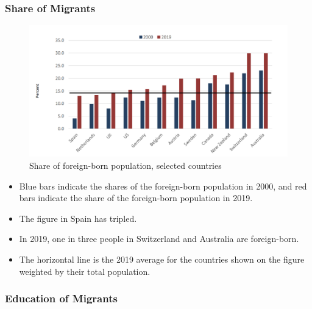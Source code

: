         \subsubsection{Share of Migrants}

            \begin{figure}[H]
                \centering
                \includegraphics[width=4.5in]{images/ch11/2.png}
                \caption{Share of foreign-born population, selected countries}
            \end{figure}
            \begin{itemize}
                \item Blue bars indicate the shares of the foreign-born population in 2000, and red bars indicate the share of the foreign-born population in 2019. 
                \item The figure in Spain has tripled.
                \item In 2019, one in three people in Switzerland and Australia are foreign-born.
                \item The horizontal line is the 2019 average for the countries shown on the figure weighted by their total population.
            \end{itemize}

        \subsubsection{Education of Migrants}

